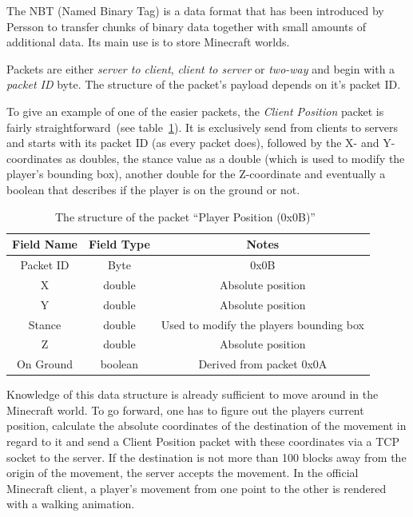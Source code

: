 The NBT (Named Binary Tag) is a data format that has been introduced by Persson to transfer chunks of binary data together with small amounts of additional data. Its main use is to store Minecraft worlds.

Packets are either \emph{server to client}, \emph{client to server} or \emph{two-way} and begin with a \emph{packet ID} byte. The structure of the packet's payload depends on it's packet ID.
 
To give an example of one of the easier packets, the \emph{Client Position} packet is fairly straightforward~(see table~\ref{mc_packet}). It is exclusively send from clients to servers and starts with its packet ID (as every packet does), followed by the X- and Y-coordinates as doubles, the stance value as a double (which is used to modify the player's bounding box), another double for the Z-coordinate and eventually a boolean that describes if the player is on the ground or not.~\cite{protocol}

\begin{table}[htb]
\centering
\begin{tabular}{|c|c|c|}\hline

    Field Name & Field Type & Notes \\ \hline
   Packet ID & Byte & 0x0B \\ \hline
   X & double & Absolute position \\ \hline
   Y & double & Absolute position \\ \hline
   Stance & double & Used to modify the players bounding box \\ \hline
   Z & double & Absolute position \\ \hline
   On Ground & boolean & Derived from packet 0x0A \\ \hline
   
\end{tabular}
\caption{The structure of the packet ``Player Position (0x0B)''~\cite{protocol}}
\label{mc_packet}
\end{table}

Knowledge of this data structure is already sufficient to move around in the Minecraft world. To go forward, one has to figure out the players current position, calculate the absolute coordinates of the destination of the movement in regard to it and send a Client Position packet with these coordinates via a TCP socket to the server. If the destination is not more than 100 blocks away from the origin of the movement, the server accepts the movement. In the official Minecraft client, a player's movement from one point to the other is rendered with a walking animation.

